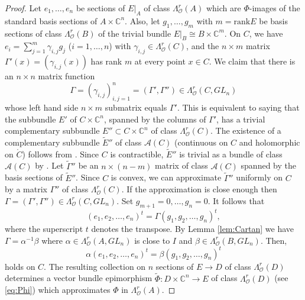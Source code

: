 \documentclass[11pt]{amsart}
\numberwithin{equation}{section}
\theoremstyle{definition}
\newcommand\Ascr{\mathscr{A}}
\newcommand\Oscr{\mathscr{O}}
\newcommand\C{\mathbb{C}}
\newcommand\wt{\widetilde}
\newcommand\rank{\mathrm{rank}}
\begin{document}
\begin{proof}
Let $e_1,\ldots,e_n$ be sections of $E|_A$ of class $\Lambda^r_\Oscr(A)$
which are $\Phi$-images of the standard basis sections
of $A\times\C^n$. Also, let $g_1,\ldots,g_m$ with $m=\rank E$
be basis sections of class $\Lambda^r_\Oscr(B)$ 
of the trivial bundle $E|_B\cong B\times\C^m$. On $C$, we have 
$e_i=\sum_{j=1}^m \gamma_{i,j}g_j$ ($i=1,\ldots,n$) 
with $\gamma_{i,j}\in\Lambda^r_\Oscr(C)$, and 
the $n\times m$ matrix $\Gamma'(x)=(\gamma_{i,j}(x))$ 
has rank $m$ at every point $x\in C$. We claim that there is
an $n\times n$ matrix function 
\[
	\Gamma=(\gamma_{i,j})_{i,j=1}^n =(\Gamma',\Gamma'') 
	\in \Lambda^r_\Oscr(C,GL_n)
\]
whose left hand side $n\times m$ submatrix equals $\Gamma'$. 
This is equivalent to saying that the subbundle $E'$ of  
$C\times\C^n$, spanned by the columns of $\Gamma'$, 
has a trivial complementary subbundle $E''\subset C\times\C^n$ of class 
$\Lambda^r_\Oscr(C)$. The existence of a complementary subbundle
$\wt E''$ of class $\Ascr(C)$ (continuous on $C$ and holomorphic 
on $\mathring C$) follows from \cite[Theorem 3]{Heunemann1986I}.
Since $C$ is contractible, $\wt E''$ is trivial as a bundle of class 
$\Ascr(C)$ by \cite[Theorem 2]{Heunemann1986I}. 
Let $\wt \Gamma''$ be an $n\times (n-m)$ matrix of class $\Ascr(C)$
spanned by the basis sections of $\wt E''$. 
Since $C$ is convex, we can approximate $\wt \Gamma''$ uniformly on $C$ 
by a matrix $\Gamma''$ of class $\Lambda^r_\Oscr(C)$. If the approximation 
is close enough then 
$\Gamma=(\Gamma',\Gamma'') \in \Lambda^r_\Oscr(C,GL_n)$. 
Set $g_{m+1}=0,\ldots,g_n=0$. It follows that 
\[
	(e_1,e_2,\ldots,e_n)^t = \Gamma (g_1,g_2,\ldots,g_n)^t,  
\]
where the superscript $t$ denotes the transpose. By 
Lemma \ref{lem:Cartan} we have $\Gamma=\alpha^{-1}\beta$
where $\alpha\in \Lambda^r_\Oscr(A,GL_n)$ is close to $I$
and $\beta \in \Lambda^r_\Oscr(B,GL_n)$. Then,
\[
	\alpha (e_1,e_2,\ldots,e_n)^t = \beta (g_1,g_2,\ldots,g_n)^t
\]
holds on $C$. The resulting collection on $n$ sections of $E\to D$ 
of class $\Lambda^r_\Oscr(D)$ determines a vector bundle epimorphism 
$\wt \Phi:D\times \C^n\to E$ of class $\Lambda^r_\Oscr(D)$ 
(see \eqref{eq:Phi}) which approximates $\Phi$ in $\Lambda^r_\Oscr(A)$.
\end{proof}
\end{document}
